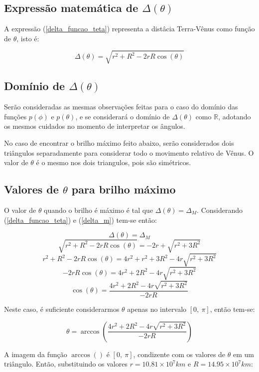 \documentclass[a4paper, 12pt]{article}
\begin{document}
\subsection{Expressão matemática de $\Delta \left(\theta \right)$}

A expressão (\ref{delta_funcao_teta}) representa a distâcia Terra-Vênus como função de $\theta$, isto é:

$$\Delta \left(\theta \right)=\sqrt{r^2+R^2-2rR\cos \left(\theta \right)}$$

\subsection{Domínio de $\Delta \left(\theta \right)$}
Serão consideradas as mesmas observações feitas para o caso do domínio das funções $p\left(\phi \right)$ e $p\left(\theta \right)$, e se considerará o domínio de $\Delta \left(\theta \right)$ como $\mathbb{R}$, adotando os mesmos cuidados no momento de interpretar os ângulos.

No caso de encontrar o brilho máximo feito abaixo, serão considerados dois triângulos separadamente para considerar todo o movimento relativo de Vênus. O valor de $\theta$ é o mesmo nos dois triangulos, pois são simétricos.

\subsection{Valores de $\theta$ para brilho máximo}

O valor de $\theta$ quando o brilho é máximo é tal que $\Delta \left(\theta \right)=\Delta _M$. Considerando (\ref{delta_funcao_teta}) e (\ref{delta_m}) tem-se então:

$$\Delta \left(\theta \right)=\Delta _M$$
$$\sqrt{r^2+R^2-2rR\cos \left(\theta \right)}=-2r+\sqrt{r^2+3R^2}$$
$$r^2+R^2-2rR\cos \left(\theta \right)=4r^2+r^2+3R^2-4r\sqrt{r^2+3R^2}$$
$$-2rR\cos \left(\theta \right)=4r^2+2R^2-4r\sqrt{r^2+3R^2}$$
$$\cos \left(\theta \right)=\frac{4r^2+2R^2-4r\sqrt{r^2+3R^2}}{-2rR}$$

Neste caso, é suficiente considerarmos  $\theta$ apenas no intervalo $[0,\ \pi]$, então tem-se:

$$\theta =\arccos \left(\frac{4r^2+2R^2-4r\sqrt{r^2+3R^2}}{-2rR}\right)$$

A imagem da função $\arccos \left(\right)$ é $[0,\ \pi]$, condizente com os valores de $\theta$ em um triângulo.
Então, substituindo os valores $r=10.81\times 10^7km$ e $R=14.95\times 10^7km$:
\end{document}
